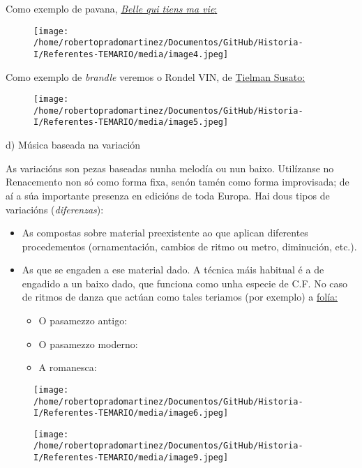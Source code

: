 \documentclass[
]{article}
\begin{document}
Como exemplo de pavana,
\href{http://open.spotify.com/track/6lvQfnbXx6sBCYDl92L3wc}{\emph{Belle
qui tiens ma vie}:}

\begin{figure}
\centering
\texttt{[image: /home/robertopradomartinez/Documentos/GitHub/Historia-I/Referentes-TEMARIO/media/image4.jpeg]}
\caption{}
\end{figure}

Como exemplo de \emph{brandle} veremos o Rondel VIN, de
\href{http://es.wikipedia.org/wiki/Tielman_Susato}{Tielman Susato:}

\begin{figure}
\centering
\texttt{[image: /home/robertopradomartinez/Documentos/GitHub/Historia-I/Referentes-TEMARIO/media/image5.jpeg]}
\caption{}
\end{figure}

d) Música baseada na variación

As variacións son pezas baseadas nunha melodía ou nun baixo. Utilízanse
no Renacemento non só como forma fixa, senón tamén como forma
improvisada; de aí a súa importante presenza en edicións de toda Europa.
Hai dous tipos de variacións (\emph{diferenzas}):

\begin{itemize}
\item
  As compostas sobre material preexistente ao que aplican diferentes
  procedementos (ornamentación, cambios de ritmo ou metro, diminución,
  etc.).
\item
  As que se engaden a ese material dado. A técnica máis habitual é a de
  engadido a un baixo dado, que funciona como unha especie de C.F. No
  caso de ritmos de danza que actúan como tales teriamos (por exemplo) a
  \href{http://es.wikipedia.org/wiki/Fol\%C3\%ADa}{folía:}

  \begin{itemize}
  \item
    O pasamezzo antigo:
  \item
    O pasamezzo moderno:
  \item
    A romanesca:
  \end{itemize}
\end{itemize}

\begin{figure}
\centering
\texttt{[image: /home/robertopradomartinez/Documentos/GitHub/Historia-I/Referentes-TEMARIO/media/image6.jpeg]}
\caption{}
\end{figure}

\begin{figure}
\centering
\texttt{[image: /home/robertopradomartinez/Documentos/GitHub/Historia-I/Referentes-TEMARIO/media/image9.jpeg]}
\caption{}
\end{figure}
\end{document}
